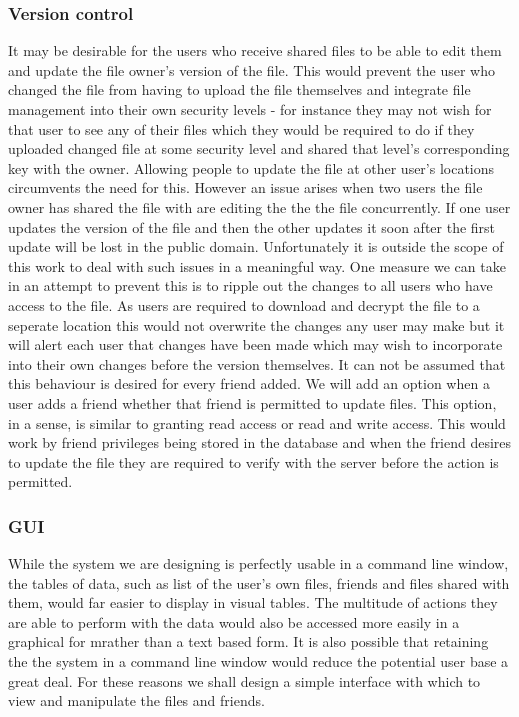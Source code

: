 \documentclass[12pt, titlepage]{article}
\begin{document}
\subsubsection{Version control}
It may be desirable for the users who receive shared files to be able to edit them and update the file owner's version of the file. This would prevent the user who changed the file from having to upload the file themselves and integrate file management into their own security levels - for instance they may not wish for that user to see any of their files which they would be required to do if they uploaded changed file at some security level and shared that level's corresponding key with the owner. Allowing people to update the file at other user's locations circumvents the need for this.
\newline \indent However an issue arises when two users the file owner has shared the file with are editing the the the file concurrently. If one user updates the version of the file and then the other updates it soon after the first update will be lost in the public domain. Unfortunately it is outside the scope of this work to deal with such issues in a meaningful way. One measure we can take in an attempt to prevent this is to ripple out the changes to all users who have access to the file. As users are required to download and decrypt the file to a seperate location this would not overwrite the changes any user may make but it will alert each user that changes have been made which may wish to incorporate into their own changes before the version themselves.
\newline \indent It can not be assumed that this behaviour is desired for every friend added. We will add an option when a user adds a friend whether that friend is permitted to update files. This option, in a sense, is similar to granting read access or read and write access. This would work by friend privileges being stored in the database and when the friend desires to update the file they are required to verify with the server before the action is permitted.

\subsubsection{GUI}
While the system we are designing is perfectly usable in a command line window, the tables of data, such as list of the user's own files, friends and files shared with them, would far easier to display in visual tables. The multitude of actions they are able to perform with the data would also be accessed more easily in a graphical for mrather than a text based form. It is also possible that retaining the the system in a command line window would reduce the potential user base a great deal. For these reasons we shall design a simple interface with which to view and manipulate the files and friends.
\end{document}
